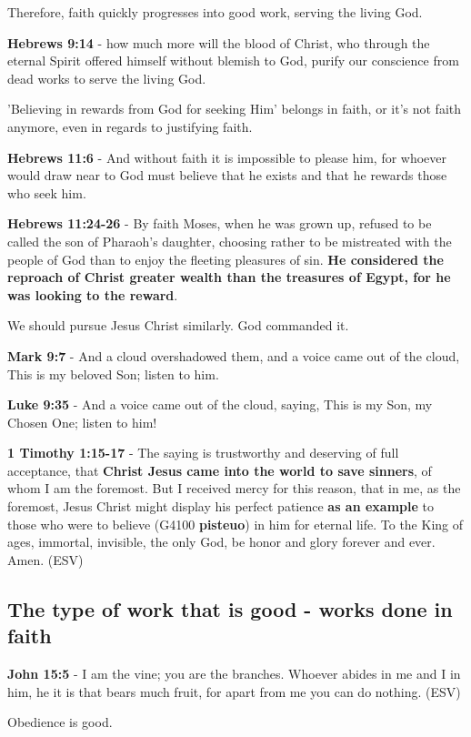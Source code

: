 \documentclass[11pt]{article}
\begin{document}
Therefore, faith quickly progresses into good work, serving the living God.

\textbf{Hebrews 9:14} - how much more will the blood of Christ, who through the eternal Spirit offered himself without blemish to God, purify our conscience from dead works to serve the living God.

'Believing in rewards from God for seeking Him' belongs in faith, or it's not faith anymore, even in regards to justifying faith.

\textbf{Hebrews 11:6} - And without faith it is impossible to please him, for whoever would draw near to God must believe that he exists and that he rewards those who seek him.

\textbf{Hebrews 11:24-26} - By faith Moses, when he was grown up, refused to be called the son of Pharaoh's daughter, choosing rather to be mistreated with the people of God than to enjoy the fleeting pleasures of sin. \textbf{He considered the reproach of Christ greater wealth than the treasures of Egypt, for he was looking to the reward}.

We should pursue Jesus Christ similarly. God commanded it.

\textbf{Mark 9:7} - And a cloud overshadowed them, and a voice came out of the cloud, This is my beloved Son; listen to him.

\textbf{Luke 9:35} - And a voice came out of the cloud, saying, This is my Son, my Chosen One; listen to him!

\textbf{1 Timothy 1:15-17} - The saying is trustworthy and deserving of full acceptance, that \textbf{Christ Jesus came into the world to save sinners}, of whom I am the foremost. But I received mercy for this reason, that in me, as the foremost, Jesus Christ might display his perfect patience \textbf{as an example} to those who were to believe (G4100 \textbf{pisteuo}) in him for eternal life. To the King of ages, immortal, invisible, the only God, be honor and glory forever and ever. Amen. (ESV)

\subsection{The type of work that is good - works done in faith}
\label{sec:orgf718d7f}
\textbf{John 15:5} - I am the vine; you are the branches. Whoever abides in me and I in him, he it is that bears much fruit, for apart from me you can do nothing. (ESV)

Obedience is good.
\end{document}

